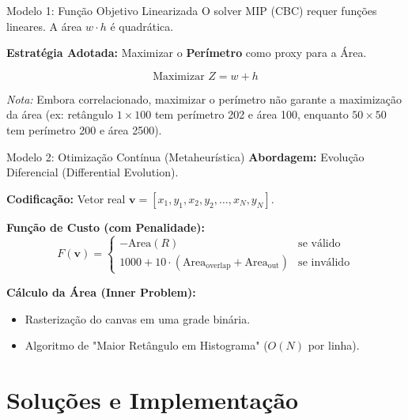 \documentclass{beamer}
\begin{document}
\begin{frame}{Modelo 1: Função Objetivo Linearizada}
    O solver MIP (CBC) requer funções lineares. A área $w \cdot h$ é quadrática.
    
    \vspace{0.5cm}
    \textbf{Estratégia Adotada:}
    Maximizar o \textbf{Perímetro} como proxy para a Área.
    
    \[ \text{Maximizar } Z = w + h \]
    
    \vspace{0.3cm}
    \textit{Nota:} Embora correlacionado, maximizar o perímetro não garante a maximização da área (ex: retângulo $1 \times 100$ tem perímetro 202 e área 100, enquanto $50 \times 50$ tem perímetro 200 e área 2500).
\end{frame}

\begin{frame}{Modelo 2: Otimização Contínua (Metaheurística)}
    \textbf{Abordagem:} Evolução Diferencial (Differential Evolution).
    
    \vspace{0.3cm}
    \textbf{Codificação:} Vetor real $\mathbf{v} = [x_1, y_1, x_2, y_2, \dots, x_N, y_N]$.
    
    \vspace{0.3cm}
    \textbf{Função de Custo (com Penalidade):}
    \[ F(\mathbf{v}) = \begin{cases} 
        - \text{Area}(R) & \text{se válido} \\
        1000 + 10 \cdot (\text{Area}_{\text{overlap}} + \text{Area}_{\text{out}}) & \text{se inválido}
    \end{cases}
    \]
    
    \vspace{0.3cm}
    \textbf{Cálculo da Área (Inner Problem):}
    \begin{itemize}
        \item Rasterização do canvas em uma grade binária.
        \item Algoritmo de "Maior Retângulo em Histograma" ($O(N)$ por linha).
    \end{itemize}
\end{frame}

\section{Soluções e Implementação}
\end{document}
